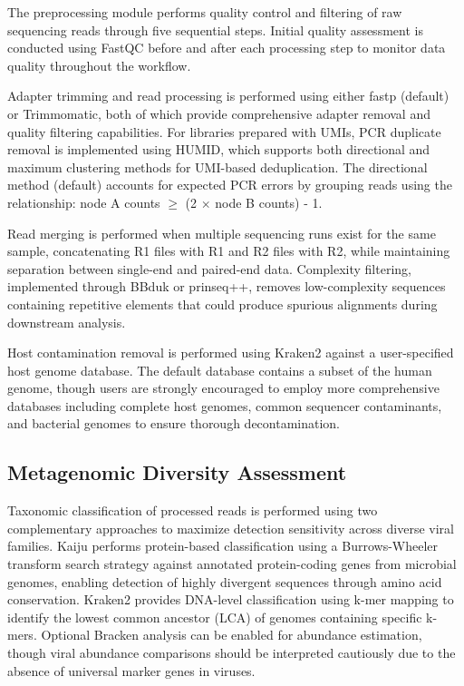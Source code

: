 \documentclass[unnumsec,webpdf,contemporary,large]{oup-authoring-template}%
\theoremstyle{thmstyleone}%
\theoremstyle{thmstyletwo}%
\theoremstyle{thmstylethree}%
\begin{document}
The preprocessing module performs quality control and filtering of raw sequencing reads through five sequential steps. Initial quality assessment is conducted using FastQC before and after each processing step to monitor data quality throughout the workflow.

Adapter trimming and read processing is performed using either fastp (default) or Trimmomatic, both of which provide comprehensive adapter removal and quality filtering capabilities. For libraries prepared with UMIs, PCR duplicate removal is implemented using HUMID, which supports both directional and maximum clustering methods for UMI-based deduplication. The directional method (default) accounts for expected PCR errors by grouping reads using the relationship: node A counts $\geq$ (2 $\times$ node B counts) - 1.

Read merging is performed when multiple sequencing runs exist for the same sample, concatenating R1 files with R1 and R2 files with R2, while maintaining separation between single-end and paired-end data. Complexity filtering, implemented through BBduk or prinseq++, removes low-complexity sequences containing repetitive elements that could produce spurious alignments during downstream analysis.

Host contamination removal is performed using Kraken2 \cite{Wood2019-jl} against a user-specified host genome database. The default database contains a subset of the human genome, though users are strongly encouraged to employ more comprehensive databases including complete host genomes, common sequencer contaminants, and bacterial genomes to ensure thorough decontamination.

\subsection{Metagenomic Diversity Assessment}\label{subsec_diversity}

Taxonomic classification of processed reads is performed using two complementary approaches to maximize detection sensitivity across diverse viral families. Kaiju \cite{Menzel2016-tz} performs protein-based classification using a Burrows-Wheeler transform search strategy against annotated protein-coding genes from microbial genomes, enabling detection of highly divergent sequences through amino acid conservation. Kraken2 \cite{Wood2019-jl} provides DNA-level classification using k-mer mapping to identify the lowest common ancestor (LCA) of genomes containing specific k-mers. Optional Bracken analysis can be enabled for abundance estimation, though viral abundance comparisons should be interpreted cautiously due to the absence of universal marker genes in viruses.
\end{document}
